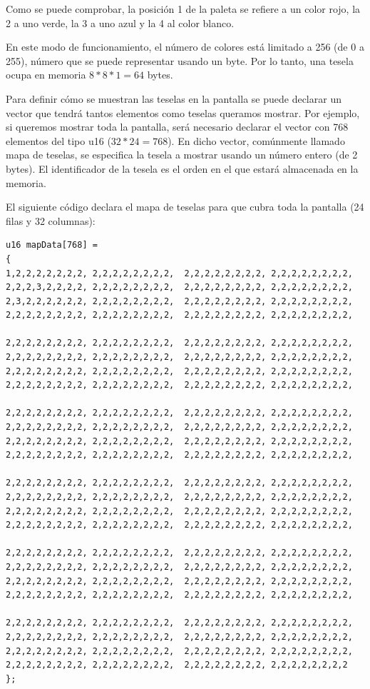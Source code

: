 Como se puede comprobar, la posición 1 de la paleta se refiere a un color rojo, la 2 a uno verde, la 3 a uno azul y la 4 al color blanco.

En este modo de funcionamiento, el número de colores está limitado a 256 (de 0 a 255), número que se puede representar usando un byte. Por lo tanto, una tesela ocupa en memoria $8*8*1=64$ bytes. 

Para definir cómo se muestran las teselas en la pantalla se puede declarar un vector que tendrá tantos elementos como teselas queramos mostrar. Por ejemplo, si queremos mostrar toda la pantalla, será necesario declarar el vector con 768 elementos del tipo u16 ($32*24=768$). En dicho vector, comúnmente llamado mapa de teselas, se especifica la tesela a mostrar usando un número entero (de 2 bytes). El identificador de la tesela es el orden en el que estará almacenada en la memoria. 

El siguiente código declara el mapa de teselas para que cubra toda la pantalla (24 filas y 32 columnas):

\begin{lstlisting}
u16 mapData[768] =
{
1,2,2,2,2,2,2,2, 2,2,2,2,2,2,2,2,  2,2,2,2,2,2,2,2, 2,2,2,2,2,2,2,2,
2,2,2,3,2,2,2,2, 2,2,2,2,2,2,2,2,  2,2,2,2,2,2,2,2, 2,2,2,2,2,2,2,2,
2,3,2,2,2,2,2,2, 2,2,2,2,2,2,2,2,  2,2,2,2,2,2,2,2, 2,2,2,2,2,2,2,2,
2,2,2,2,2,2,2,2, 2,2,2,2,2,2,2,2,  2,2,2,2,2,2,2,2, 2,2,2,2,2,2,2,2,

2,2,2,2,2,2,2,2, 2,2,2,2,2,2,2,2,  2,2,2,2,2,2,2,2, 2,2,2,2,2,2,2,2,
2,2,2,2,2,2,2,2, 2,2,2,2,2,2,2,2,  2,2,2,2,2,2,2,2, 2,2,2,2,2,2,2,2,
2,2,2,2,2,2,2,2, 2,2,2,2,2,2,2,2,  2,2,2,2,2,2,2,2, 2,2,2,2,2,2,2,2,
2,2,2,2,2,2,2,2, 2,2,2,2,2,2,2,2,  2,2,2,2,2,2,2,2, 2,2,2,2,2,2,2,2,

2,2,2,2,2,2,2,2, 2,2,2,2,2,2,2,2,  2,2,2,2,2,2,2,2, 2,2,2,2,2,2,2,2,
2,2,2,2,2,2,2,2, 2,2,2,2,2,2,2,2,  2,2,2,2,2,2,2,2, 2,2,2,2,2,2,2,2,
2,2,2,2,2,2,2,2, 2,2,2,2,2,2,2,2,  2,2,2,2,2,2,2,2, 2,2,2,2,2,2,2,2,
2,2,2,2,2,2,2,2, 2,2,2,2,2,2,2,2,  2,2,2,2,2,2,2,2, 2,2,2,2,2,2,2,2,

2,2,2,2,2,2,2,2, 2,2,2,2,2,2,2,2,  2,2,2,2,2,2,2,2, 2,2,2,2,2,2,2,2,
2,2,2,2,2,2,2,2, 2,2,2,2,2,2,2,2,  2,2,2,2,2,2,2,2, 2,2,2,2,2,2,2,2,
2,2,2,2,2,2,2,2, 2,2,2,2,2,2,2,2,  2,2,2,2,2,2,2,2, 2,2,2,2,2,2,2,2,
2,2,2,2,2,2,2,2, 2,2,2,2,2,2,2,2,  2,2,2,2,2,2,2,2, 2,2,2,2,2,2,2,2,

2,2,2,2,2,2,2,2, 2,2,2,2,2,2,2,2,  2,2,2,2,2,2,2,2, 2,2,2,2,2,2,2,2,
2,2,2,2,2,2,2,2, 2,2,2,2,2,2,2,2,  2,2,2,2,2,2,2,2, 2,2,2,2,2,2,2,2,
2,2,2,2,2,2,2,2, 2,2,2,2,2,2,2,2,  2,2,2,2,2,2,2,2, 2,2,2,2,2,2,2,2,
2,2,2,2,2,2,2,2, 2,2,2,2,2,2,2,2,  2,2,2,2,2,2,2,2, 2,2,2,2,2,2,2,2,

2,2,2,2,2,2,2,2, 2,2,2,2,2,2,2,2,  2,2,2,2,2,2,2,2, 2,2,2,2,2,2,2,2,
2,2,2,2,2,2,2,2, 2,2,2,2,2,2,2,2,  2,2,2,2,2,2,2,2, 2,2,2,2,2,2,2,2,
2,2,2,2,2,2,2,2, 2,2,2,2,2,2,2,2,  2,2,2,2,2,2,2,2, 2,2,2,2,2,2,2,2,
2,2,2,2,2,2,2,2, 2,2,2,2,2,2,2,2,  2,2,2,2,2,2,2,2, 2,2,2,2,2,2,2,2
};
\end{lstlisting}

